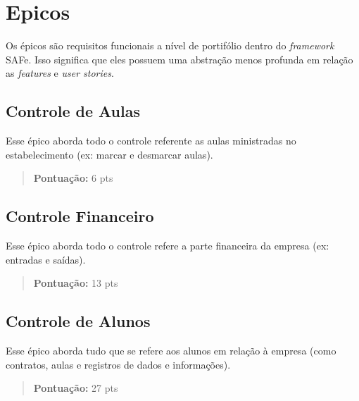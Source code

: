 \section[Epicos]{Epicos}
Os épicos são requisitos funcionais a nível de portifólio dentro do
\textsl{framework} SAFe. Isso significa que eles possuem uma abstração menos profunda em relação
as \textsl{features} e \textsl{user stories}.

\subsection[Controle de Aulas]{Controle de Aulas}
Esse épico aborda todo o controle referente as aulas ministradas no estabelecimento (ex: marcar e desmarcar aulas).
\begin{quote}
    \textbf{Pontuação:} 6 pts
\end{quote}

\subsection[Controle Financeiro]{Controle Financeiro}
Esse épico aborda todo o controle refere a parte financeira da empresa (ex: entradas e saídas).
\begin{quote}
    \textbf{Pontuação:} 13 pts
\end{quote}

\subsection[Controle de Alunos]{Controle de Alunos}
Esse épico aborda tudo que se refere aos alunos em relação à empresa (como contratos, aulas e registros de dados e informações).
\begin{quote}
    \textbf{Pontuação:} 27 pts
\end{quote}
